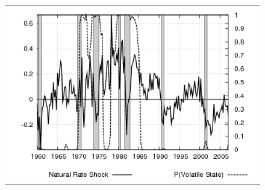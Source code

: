 \documentclass[12pt]{article}
\begin{document}
\begin{figure}[ht]
\begin{center}
\begin{tabular}{c}
\includegraphics[scale=0.5]{results_cg_wlsinit/natrate.png} 
\end{tabular}
\end{center}
\end{figure}
\end{document}
